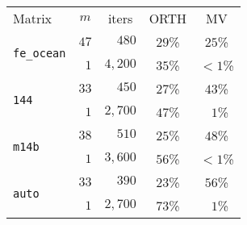 \begin{tabular}{l|c|c|c|c}
\hline
\multirow{2}{*}{Matrix} & \multirow{2}{*}{$m$} & \multirow{2}{*}{iters} & \multirow{2}{*}{ORTH}& \multirow{2}{*}{MV} \\
 & & & & \\\hline
\hline
\multirow{2}{*}{\texttt{fe\_ocean}} & $47$ & $\phantom{0,{}}480$ & $29$\% & $25$\%\\
  & $\phantom{0}1$ & $4,200$ & $35$\% & ${}<\!\! 1$\%\\\hline
\multirow{2}{*}{\texttt{144}} & $33$ & $\phantom{0,{}}450$ & $27$\% & $43$\%\\
  & $\phantom{0}1$ & $2,700$ & $47$\% & $\phantom{0}1$\%\\\hline
\multirow{2}{*}{\texttt{m14b}} & $38$ & $\phantom{0,{}}510$ & $25$\% & $48$\%\\
  & $\phantom{0}1$ & $3,600$ & $56$\% & ${}<\!\! 1$\%\\\hline
\multirow{2}{*}{\texttt{auto}} & $33$ & $\phantom{0,{}}390$ & $23$\% & $56$\%\\
  & $\phantom{0}1$ & $2,700$ & $73$\% & $\phantom{0}1$\%\\\hline
\end{tabular}